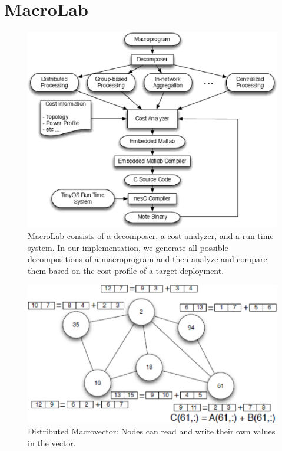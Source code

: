 \chapter{MacroLab}
\label{appendix:macrolab}

\begin{figure}
  \centering
  \includegraphics[width=0.8\columnwidth]{fig/System.eps}
  \caption[MacroLab system architecture]{MacroLab consists of a decomposer, a
  cost analyzer, and a run-time system. In our implementation, we generate all
  possible decompositions of a macroprogram and then analyze and compare them
  based on the cost profile of a target deployment.}
  \label{fig:System}
\end{figure}

\begin{figure}
  \centering
  \includegraphics[width=0.8\columnwidth]{fig/DistributedArray.eps}
  \caption[Distributed Macrovector]{Distributed Macrovector: Nodes can read and write their own values in
  the vector.}
  \label{fig:distributedVector}
\end{figure}


